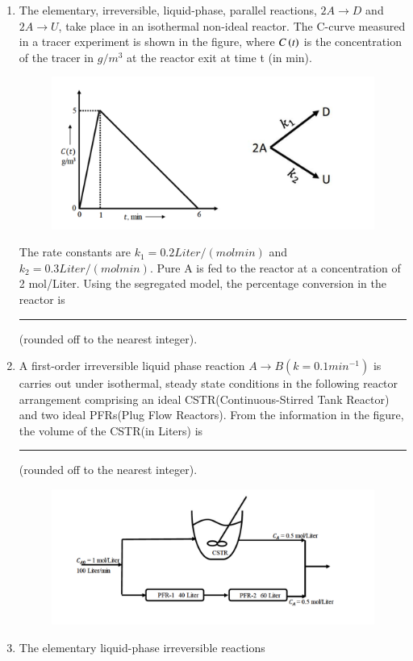 \documentclass[journal,12pt,onecolumn]{IEEEtran}
\theoremstyle{remark}
\begin{document}
\begin{enumerate}
\hfill{}

    \item The elementary, irreversible, liquid-phase, parallel reactions, $2A \to D$ and $2A\to U$, take place in an isothermal non-ideal reactor. The C-curve measured in a tracer experiment is shown in the figure, where $C\left(t\right)$ is the concentration of the tracer in $g/m^3$ at the reactor exit at time t (in min). 

\hfill{}
\begin{figure}[H]
    \centering
    \includegraphics[width=0.9\linewidth]{Fig/45.png}
    \caption{}
    \label{fig:45}
\end{figure}

    The rate constants are $k_1 = 0.2 Liter/(mol min)$ and $k_2 = 0.3 Liter/(mol min)$. Pure A is fed to the reactor at a concentration of 2 mol/Liter. Using the segregated model, the percentage conversion in the reactor is \rule{1.5cm}{0.1mm}(rounded off to the nearest integer).
    
\hfill{}
\newpage
    \item A first-order irreversible liquid phase reaction $A \to B(k = 0.1 min^{-1})$ is carries out under isothermal, steady state conditions in the following reactor arrangement comprising an ideal CSTR(Continuous-Stirred Tank Reactor) and two ideal PFRs(Plug Flow Reactors). From the information in the figure, the volume of the CSTR(in Liters) is \rule{1.5cm}{0.1mm}(rounded off to the nearest integer).
    
\hfill{}
\begin{figure}[H]
    \centering
    \includegraphics[width=0.6 \columnwidth]{Fig/46.png}
    \caption*{}
    \label{fig: 46}
\end{figure}
    \item 
        The elementary liquid-phase irreversible reactions 
    

\end{enumerate}
\end{document}
